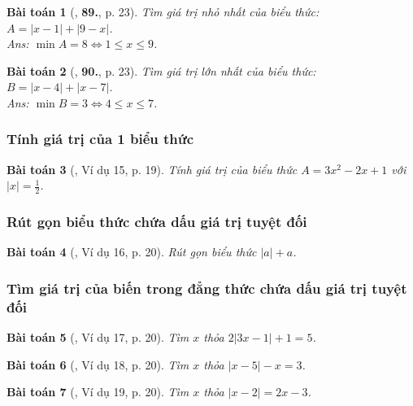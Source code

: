 \documentclass{article}
\numberwithin{equation}{section}
\newtheorem{baitoan}{Bài toán}
\begin{document}
\begin{baitoan}[\cite{Tuyen_Toan_7}, \textbf{89.}, p. 23]
	Tìm giá trị nhỏ nhất của biểu thức: $A = |x - 1| + |9 - x|$.\\\mbox{}\hfill{\sf Ans:} $\min A = 8\Leftrightarrow 1\le x\le 9$.
\end{baitoan}

\begin{baitoan}[\cite{Tuyen_Toan_7}, \textbf{90.}, p. 23]
	Tìm giá trị lớn nhất của biểu thức: $B = |x - 4| + |x - 7|$.\\\mbox{}\hfill{\sf Ans:} $\min B = 3\Leftrightarrow 4\le x\le 7$.
\end{baitoan}

\subsubsection{Tính giá trị của 1 biểu thức}

\begin{baitoan}[\cite{Binh_Toan_7_tap_1}, Ví dụ 15, p. 19]
	Tính giá trị của biểu thức $A = 3x^2 - 2x + 1$ với $|x| = \frac{1}{2}$.
\end{baitoan}

\subsubsection{Rút gọn biểu thức chứa dấu giá trị tuyệt đối}

\begin{baitoan}[\cite{Binh_Toan_7_tap_1}, Ví dụ 16, p. 20]
	Rút gọn biểu thức $|a| + a$.
\end{baitoan}

\subsubsection{Tìm giá trị của biến trong đẳng thức chứa dấu giá trị tuyệt đối}

\begin{baitoan}[\cite{Binh_Toan_7_tap_1}, Ví dụ 17, p. 20]
	Tìm $x$ thỏa $2|3x - 1| + 1 = 5$.
\end{baitoan}

\begin{baitoan}[\cite{Binh_Toan_7_tap_1}, Ví dụ 18, p. 20]
	Tìm $x$ thỏa $|x - 5| - x = 3$.
\end{baitoan}

\begin{baitoan}[\cite{Binh_Toan_7_tap_1}, Ví dụ 19, p. 20]
	Tìm $x$ thỏa $|x - 2| = 2x - 3$.
\end{baitoan}
\end{document}
